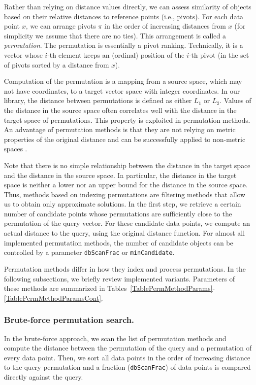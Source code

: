 \documentclass[runningheads,a4paper]{llncs}
\newcommand{\ttt}[1]{\texttt{#1}}
\begin{document}
{Rather than relying on distance values directly,
we can assess similarity of objects based on their
relative distances to reference points (i.e., pivots).
For each data point $x$,
we can arrange pivots $\pi$ in the order of increasing distances from $x$ (for
simplicity we assume that there are no ties).
This arrangement is called a \emph{permutation}.
The permutation is essentially a pivot ranking. 
Technically, it is a vector whose \mbox{$i$-th}
element keeps an (ordinal) position of the \mbox{$i$-th} pivot (in the set of pivots
sorted by a distance from $x$).

Computation of the permutation
is a mapping from a source space, which may not have coordinates, to a target vector space with integer coordinates. 
In our library, the distance between permutations is defined as either $L_1$ or $L_2$.
Values of the distance in the source space often correlates well with the distance in the target space
of permutations.
This property is exploited in permutation methods.
An advantage of permutation methods is that they are not relying on metric properties of the original distance 
and can be successfully applied to non-metric spaces \cite{Boytsov_and_Bilegsaikhan:nips2013,naidan2015permutation}.

Note that there is no simple relationship between the distance in the target space
and the distance in the source space. In particular, the distance in the target space is neither a lower nor an upper bound
for the distance in the source space.
Thus, methods based on indexing permutations are filtering methods that allow us to obtain only approximate solutions.
In the first step, we retrieve a certain number of candidate points whose permutations are sufficiently close
to the permutation of the query vector.
For these candidate data points, we compute an actual distance to the query, using the original distance function.
For almost all implemented permutation methods, 
the number of candidate objects can be controlled by a parameter \ttt{dbScanFrac} or \ttt{minCandidate}.


Permutation methods differ in how they index and process permutations.
In the following subsections, we briefly review implemented variants.
Parameters of these methods are summarized in Tables~\ref{TablePermMethodParams}-\ref{TablePermMethodParamsCont}.

\subsubsection{Brute-force permutation search.}
In the brute-force approach, we scan the list of permutation methods and compute the distance
between the permutation of the query and a permutation of every data point.
Then, we sort all data points in the order of increasing distance to the query permutation
and a fraction (\ttt{dbScanFrac}) of data points is compared directly against the query.

}
\end{document}

